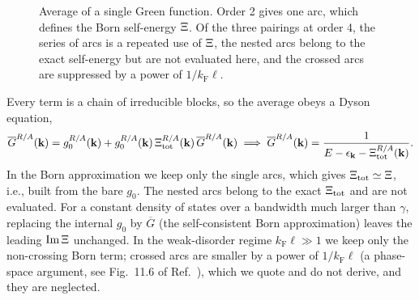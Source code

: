 \begin{figure}[ht]
\centering
{}
\caption{Average of a single Green function. Order 2 gives one
arc, which defines the Born self-energy $\Xi$. Of the three
pairings at order 4, the series of arcs is a repeated use of
$\Xi$, the nested arcs belong to the exact self-energy but are
not evaluated here, and the crossed arcs are suppressed by a
power of $1/k_{\mathrm F}\ell$.}
\label{fig:arcs}
\end{figure}


Every term is a chain of irreducible blocks, so the average obeys
a Dyson equation,
\[
\overline{G}^{R/A}(\mathbf k)
=g_0^{R/A}(\mathbf k)
+g_0^{R/A}(\mathbf k)\,
\Xi^{R/A}_{\mathrm{tot}}(\mathbf k)\,
\overline{G}^{R/A}(\mathbf k)
\;\Longrightarrow\;
\overline{G}^{R/A}(\mathbf k)
=\frac{1}{E-\epsilon_{\mathbf k}
-\Xi^{R/A}_{\mathrm{tot}}(\mathbf k)}.
\]
In the Born approximation we keep only the single arcs, which
gives $\Xi_{\mathrm{tot}}\simeq\Xi$, i.e., built from the bare
$g_0$. The nested arcs belong to the exact
$\Xi_{\mathrm{tot}}$ and are not evaluated. For a constant density
of states over a bandwidth much larger than $\gamma$, replacing
the internal $g_0$ by $\overline G$ (the self-consistent Born
approximation) leaves the leading $\operatorname{Im}\Xi$
unchanged. In the weak-disorder regime $k_{\mathrm F}\ell\gg1$
we keep only the non-crossing Born term; crossed arcs are smaller
by a power of $1/k_{\mathrm F}\ell$ (a phase-space argument, see
Fig.~11.6 of Ref.~\cite{BruusFlensberg}), which we quote and do
not derive, and they are neglected.

